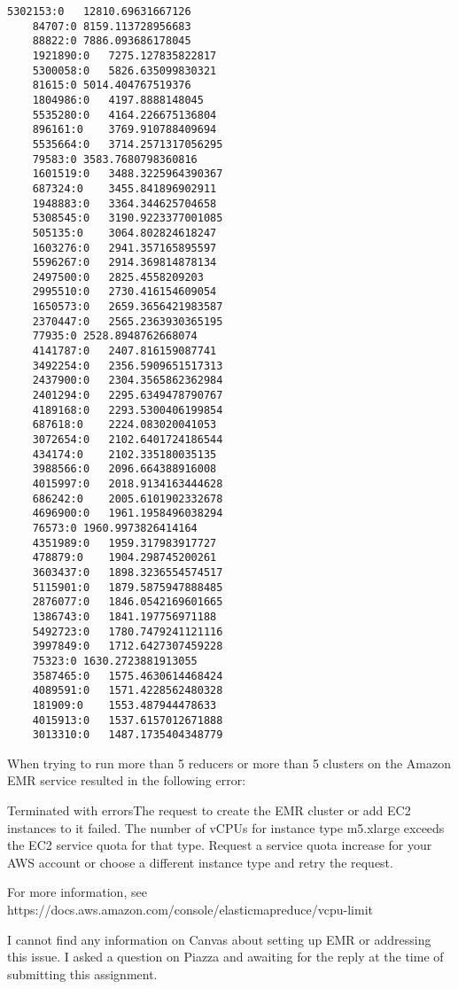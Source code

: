 \documentclass{homework}
\renewenvironment{quote}{\vspace{6pt plus 2pt minus 1pt}\begin{customblockquote}\fontfamily{lmtt}\selectfont\list{}{\rightmargin=0.75em\leftmargin=0.75em}%
\item\relax\color{blockquote-text}\ignorespaces}{\unskip\unskip\endlist\end{customblockquote}}
\begin{document}
\begin{lstlisting}[caption={output.txt}]
    5302153:0	12810.69631667126
    84707:0	8159.113728956683
    88822:0	7886.093686178045
    1921890:0	7275.127835822817
    5300058:0	5826.635099830321
    81615:0	5014.404767519376
    1804986:0	4197.8888148045
    5535280:0	4164.226675136804
    896161:0	3769.910788409694
    5535664:0	3714.2571317056295
    79583:0	3583.7680798360816
    1601519:0	3488.3225964390367
    687324:0	3455.841896902911
    1948883:0	3364.344625704658
    5308545:0	3190.9223377001085
    505135:0	3064.802824618247
    1603276:0	2941.357165895597
    5596267:0	2914.369814878134
    2497500:0	2825.4558209203
    2995510:0	2730.416154609054
    1650573:0	2659.3656421983587
    2370447:0	2565.2363930365195
    77935:0	2528.8948762668074
    4141787:0	2407.816159087741
    3492254:0	2356.5909651517313
    2437900:0	2304.3565862362984
    2401294:0	2295.6349478790767
    4189168:0	2293.5300406199854
    687618:0	2224.083020041053
    3072654:0	2102.6401724186544
    434174:0	2102.335180035135
    3988566:0	2096.664388916008
    4015997:0	2018.9134163444628
    686242:0	2005.6101902332678
    4696900:0	1961.1958496038294
    76573:0	1960.9973826414164
    4351989:0	1959.317983917727
    478879:0	1904.298745200261
    3603437:0	1898.3236554574517
    5115901:0	1879.5875947888485
    2876077:0	1846.0542169601665
    1386743:0	1841.197756971188
    5492723:0	1780.7479241121116
    3997849:0	1712.6427307459228
    75323:0	1630.2723881913055
    3587465:0	1575.4630614468424
    4089591:0	1571.4228562480328
    181909:0	1553.487944478633
    4015913:0	1537.6157012671888
    3013310:0	1487.1735404348779    
\end{lstlisting}

\newpage
When trying to run more than 5 reducers or more than 5 clusters on the Amazon EMR service resulted in the following error: 

\begin{quote}
    Terminated with errorsThe request to create the EMR cluster or add EC2 instances to it failed. The number of vCPUs for instance type m5.xlarge exceeds the EC2 service quota for that type. Request a service quota increase for your AWS account or choose a different instance type and retry the request. 
    
    For more information, see https://docs.aws.amazon.com/console/elasticmapreduce/vcpu-limit
\end{quote}

I cannot find any information on Canvas about setting up EMR or addressing this issue. I asked a question on Piazza and awaiting for the reply at the time of submitting this assignment.
\end{document}
